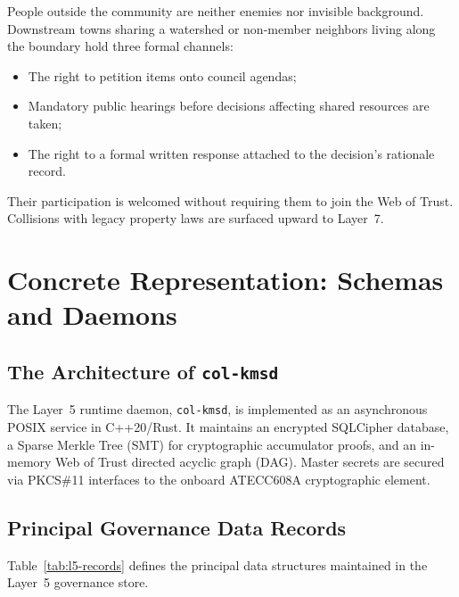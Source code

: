 People outside the community are neither enemies nor invisible background. Downstream towns sharing a watershed or non-member neighbors living along the boundary hold three formal channels:
\begin{itemize}
  \item The right to petition items onto council agendas;
  \item Mandatory public hearings before decisions affecting shared resources are taken;
  \item The right to a formal written response attached to the decision's rationale record.
\end{itemize}
Their participation is welcomed without requiring them to join the Web of Trust. Collisions with legacy property laws are surfaced upward to Layer~7.

\section{Concrete Representation: Schemas and Daemons}
\label{sec:l5-representation}

\subsection{The Architecture of \texttt{col-kmsd}}

The Layer~5 runtime daemon, \texttt{col-kmsd}, is implemented as an asynchronous POSIX service in C++20/Rust. It maintains an encrypted SQLCipher database, a Sparse Merkle Tree (SMT) for cryptographic accumulator proofs, and an in-memory Web of Trust directed acyclic graph (DAG). Master secrets are secured via PKCS\#11 interfaces to the onboard ATECC608A cryptographic element.

\subsection{Principal Governance Data Records}

Table~\ref{tab:l5-records} defines the principal data structures maintained in the Layer~5 governance store.

